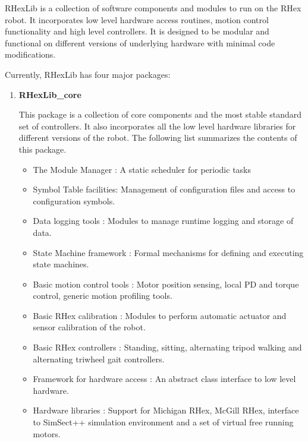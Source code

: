 RHexLib is a collection of software components and modules to run on the
RHex robot. It incorporates low level hardware access routines, motion
control functionality and high level controllers. It is designed to be
modular and functional on different versions of underlying hardware with
minimal code modifications.

Currently, RHexLib has four major packages:

\begin{enumerate}
\item{\bf RHexLib\_core}\par 
This package is a collection of core components and the most stable standard
set of controllers. It also incorporates all the low level hardware
libraries for different versions of the robot. The following list summarizes
the contents of this package.

\begin{itemize}

\item{The Module Manager : A static scheduler for
periodic tasks}

\item{Symbol Table facilities: Management of configuration files and access
to configuration symbols.}

\item{Data logging tools : Modules to manage runtime logging and
storage of data.}

\item{State Machine framework : Formal mechanisms for defining and executing
state machines.}

\item{Basic motion control tools : Motor position sensing, local PD and
torque control, generic motion profiling tools.}

\item{Basic RHex calibration : Modules to perform automatic actuator and
sensor calibration of the robot.}

\item{Basic RHex controllers : Standing, sitting, alternating tripod walking
and alternating triwheel gait controllers.}

\item{Framework for hardware access : An abstract  class interface to low level hardware.}

\item{Hardware libraries : Support for Michigan RHex, McGill RHex, interface
to SimSect++ simulation environment and a set of virtual free running
motors.}


\end{itemize}
\end{enumerate}
